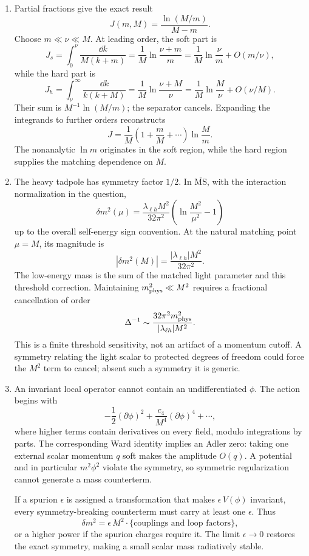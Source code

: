 \begin{enumerate}
\begin{enumerate}
\item
Partial fractions give the exact result
\[
 \boxed{J(m,M)=\frac{\ln(M/m)}{M-m}.}
\]
Choose \(m\ll\nu\ll M\).  At leading order, the soft part is
\[
 J_s=\int_0^\nu\frac{\dd k}{M(k+m)}
 =\frac1M\ln\frac{\nu+m}{m}
 =\frac1M\ln\frac\nu m+O(m/\nu),
\]
while the hard part is
\[
 J_h=\int_\nu^\infty\frac{\dd k}{k(k+M)}
 =\frac1M\ln\frac{\nu+M}{\nu}
 =\frac1M\ln\frac M\nu+O(\nu/M).
\]
Their sum is \(M^{-1}\ln(M/m)\); the separator cancels.  Expanding the
integrands to further orders reconstructs
\[
 J=\frac1M\left(1+\frac mM+\cdots\right)\ln\frac Mm.
\]
The nonanalytic \(\ln m\) originates in the soft region, while the hard
region supplies the matching dependence on \(M\).
\item
The heavy tadpole has symmetry factor \(1/2\).  In
\(\overline{\mathrm{MS}}\), with the interaction normalization in the
question,
\[
 \boxed{\delta m^2(\mu)=
 \frac{\lambda_{\ell h}M^2}{32\pi^2}
 \left(\ln\frac{M^2}{\mu^2}-1\right)}
\]
up to the overall self-energy sign convention.  At the natural matching
point \(\mu=M\), its magnitude is
\[
 |\delta m^2(M)|=\frac{|\lambda_{\ell h}|M^2}{32\pi^2}.
\]
The low-energy mass is the sum of the matched light parameter and this
threshold correction.  Maintaining \(m_{\rm phys}^2\ll M^2\) requires a
fractional cancellation of order
\[
 \Delta^{-1}\sim
 \frac{32\pi^2m_{\rm phys}^2}{|\lambda_{\ell h}|M^2}.
\]
This is a finite threshold sensitivity, not an artifact of a momentum
cutoff.  A symmetry relating the light scalar to protected degrees of
freedom could force the \(M^2\) term to cancel; absent such a symmetry it is
generic.
\item
An invariant local operator cannot contain an undifferentiated \(\phi\).
The action begins with
\[
 -\frac12(\partial\phi)^2
 +\frac{c_4}{M^4}(\partial\phi)^4+\cdots,
\]
where higher terms contain derivatives on every field, modulo integrations
by parts.  The corresponding Ward identity implies an Adler zero: taking
one external scalar momentum \(q\) soft makes the amplitude
\(O(q)\).  A potential and in particular \(m^2\phi^2\) violate the symmetry,
so symmetric regularization cannot generate a mass counterterm.

If a spurion \(\epsilon\) is assigned a transformation that makes
\(\epsilon\,V(\phi)\) invariant, every symmetry-breaking counterterm must
carry at least one \(\epsilon\).  Thus
\[
 \delta m^2=\epsilon\,M^2
 \cdot\{\text{couplings and loop factors}\},
\]
or a higher power if the spurion charges require it.  The limit
\(\epsilon\to0\) restores the exact symmetry, making a small scalar mass
radiatively stable.
\end{enumerate}


\end{enumerate}
